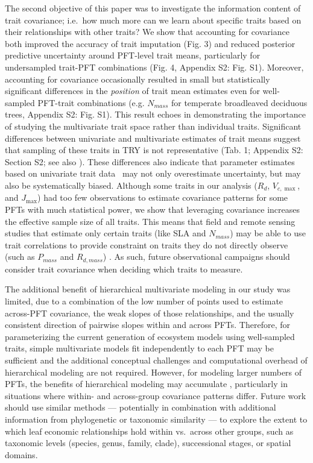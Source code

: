 \documentclass{article}
\begin{document}
The second objective of this paper was to investigate the information content of trait covariance;
i.e.\ how much more can we learn about specific traits based on their relationships with other traits?
We show that accounting for covariance both improved the accuracy of trait imputation (Fig. 3) and reduced posterior predictive uncertainty around PFT-level trait means, particularly for undersampled trait-PFT combinations (Fig. 4, Appendix S2: Fig. S1).
Moreover, accounting for covariance occasionally resulted in small but statistically significant differences in the \textit{position} of trait mean estimates even for well-sampled PFT-trait combinations (e.g. $N_{mass}$ for temperate broadleaved deciduous trees, Appendix S2: Fig. S1).
This result echoes \citet{diaz_2015_global} in demonstrating the importance of studying the multivariate trait space rather than individual traits.
Significant differences between univariate and multivariate estimates of trait means suggest that sampling of these traits in TRY is not representative (Tab. 1; Appendix S2: Section S2; see also \citealt{kattge_2011_try}).
These differences also indicate that parameter estimates based on univariate trait data~\cite[e.g.,][]{lebauer_2013_facilitating,dietze_2014_quantitative,butler_2017_mapping} may not only overestimate uncertainty, but may also be systematically biased.
Although some traits in our analysis ($R_{d}$, $V_{c,\max}$, and $J_{\max}$) had too few observations to estimate covariance patterns for some PFTs with much statistical power,
we show that leveraging covariance increases the effective sample size of all traits.
This means that field and remote sensing studies that estimate only certain traits (like SLA and $N_{mass}$) may be able to use trait correlations to provide constraint on traits they do not directly observe (such as $P_{mass}$ and $R_{d,mass}$) \citep{singh_2015_imaging,musavi_2015_imprint,lepine_2016_examining,serbin_2014_spectroscopic}.
As such, future observational campaigns should consider trait covariance when deciding which traits to measure.

The additional benefit of hierarchical multivariate modeling in our study was limited, due to a combination of the low number of points used to estimate across-PFT covariance, the weak slopes of those relationships, and the usually consistent direction of pairwise slopes within and across PFTs.
Therefore, for parameterizing the current generation of ecosystem models using well-sampled traits, simple multivariate models fit independently to each PFT may be sufficient and the additional conceptual challenges and computational overhead of hierarchical modeling are not required.
However, for modeling larger numbers of PFTs, the benefits of hierarchical modeling may accumulate \citep{dietze_2008_capturing,cressie_2009_accounting,webb_2010_structured,clark_2004_why}, particularly in situations where within- and across-group covariance patterns differ.
Future work should use similar methods --- potentially in combination with additional information from phylogenetic or taxonomic similarity \citep{symonds_2014_primer} --- to explore the extent to which leaf economic relationships hold within vs.\ across other groups, such as taxonomic levels (species, genus, family, clade), successional stages, or spatial domains.
\end{document}
